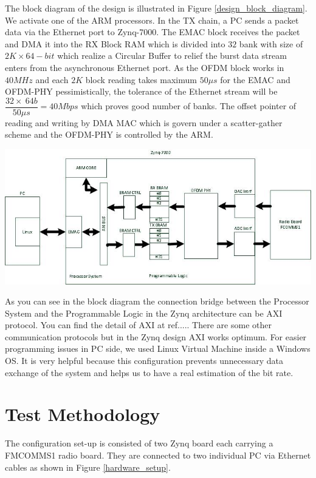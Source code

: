 The block diagram of the design is illustrated in Figure \ref{design_block_diagram}. We activate one of the ARM processors. In the TX chain, a PC sends a packet data via the Ethernet port to Zynq-7000. The EMAC block receives the packet and DMA it into the RX Block RAM which is divided into $32$ bank with size of $2K \times 64-bit$ which realize a Circular Buffer to relief the burst data stream enters from the asynchronous Ethernet port. As the OFDM block works in $40 MHz$ and each $2K$ block reading takes maximum $50\mu s$ for the EMAC and OFDM-PHY pessimistically, the tolerance of the Ethernet stream will be $\dfrac{32 \times \ 64b}{50\mu s} = 40Mbps$ which proves good number of banks. The offset pointer of reading and writing by DMA MAC which is govern under a scatter-gather scheme and the OFDM-PHY is controlled by the ARM.\\

\begin{center}
\includegraphics[width=\textwidth]{content/fig/fpga_internal.JPG}
\label{design_block_diagram}
\end{center}

As you can see in the block diagram the connection bridge between the Processor System and the Programmable Logic in the Zynq architecture can be AXI protocol. You can find the detail of AXI at ref..... There are some other communication protocols but in the Zynq design AXI works optimum.
For easier programming issues in PC side, we used Linux Virtual Machine inside a Windows OS. It is very helpful because this configuration prevents unnecessary data exchange of the system and helps us to have a real estimation of the bit rate.\\

\section{Test Methodology}
The configuration set-up is consisted of two Zynq board each carrying a FMCOMMS1 radio board. They are connected to two individual PC via Ethernet cables as shown in Figure \ref{hardware_setup}.\\


